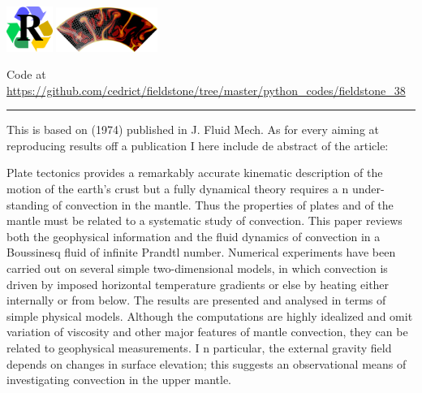 
\includegraphics[width=1.5cm]{images/pictograms/replication}
\includegraphics[width=3.3cm]{images/pictograms/aspect_logo}



\begin{center}
Code at \url{https://github.com/cedrict/fieldstone/tree/master/python_codes/fieldstone_38}
\end{center}

\par\noindent\rule{\textwidth}{0.4pt}


This \stone is based on \textcite{mcrw74} (1974) published in J. Fluid Mech.
As for every \stone aiming at reproducing results off a publication I here include de abstract
of the article:

\begin{center}
\begin{minipage}{13cm}
{\small 
Plate tectonics provides a remarkably accurate kinematic description of the
motion of the earth’s crust but a fully dynamical theory requires a n under-
standing of convection in the mantle. Thus the properties of plates and of the
mantle must be related to a systematic study of convection. This paper reviews
both the geophysical information and the fluid dynamics of convection in a
Boussinesq fluid of infinite Prandtl number. Numerical experiments have been
carried out on several simple two-dimensional models, in which convection is
driven by imposed horizontal temperature gradients or else by heating either
internally or from below. The results are presented and analysed in terms of
simple physical models. Although the computations are highly idealized and
omit variation of viscosity and other major features of mantle convection, they
can be related to geophysical measurements. I n particular, the external gravity
field depends on changes in surface elevation; this suggests an observational
means of investigating convection in the upper mantle.}
\end{minipage}
\end{center}

